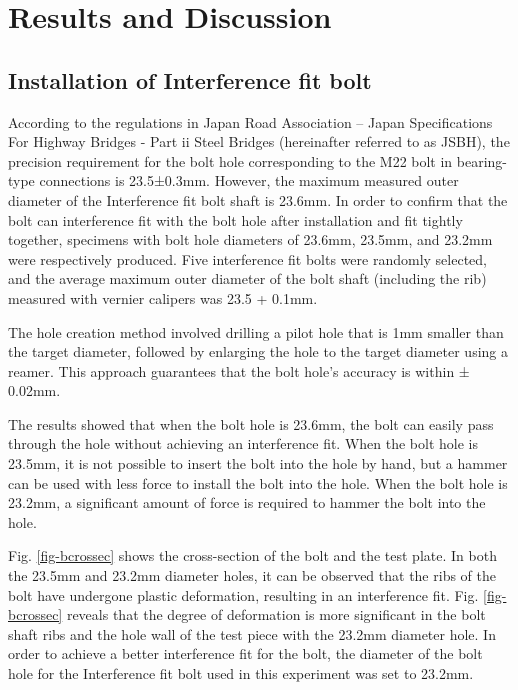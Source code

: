 \section{Results and Discussion}

\subsection{Installation of Interference fit bolt}

According to the regulations in Japan Road Association -- Japan Specifications For Highway Bridges - Part ii Steel Bridges\cite{douji2017} (hereinafter referred to as JSBH), the precision requirement for the bolt hole corresponding to the M22 bolt in bearing-type connections is 23.5±0.3mm. However, the maximum measured outer diameter of the Interference fit bolt shaft is 23.6mm. In order to confirm that the bolt can interference fit with the bolt hole after installation and fit tightly together, specimens with bolt hole diameters of 23.6mm, 23.5mm, and 23.2mm were respectively produced. Five interference fit bolts were randomly selected, and the average maximum  outer diameter of the bolt shaft (including the rib) measured with vernier calipers was 23.5 + 0.1mm.

The hole creation method involved drilling a pilot hole that is 1mm smaller than the target diameter, followed by enlarging the hole to the target diameter using a reamer. This approach guarantees that the bolt hole's accuracy is within ± 0.02mm.

The results showed that when the bolt hole is 23.6mm, the bolt can easily pass through the hole without achieving an interference fit. When the bolt hole is 23.5mm, it is not possible to insert the bolt into the hole by hand, but a hammer can be used with less force to install the bolt into the hole. When the bolt hole is 23.2mm, a significant amount of force is required to hammer the bolt into the hole.

Fig. \ref{fig-bcrossec} shows the cross-section of the bolt and the test plate. In both the 23.5mm and 23.2mm diameter holes, it can be observed that the ribs of the bolt have undergone plastic deformation, resulting in an interference fit. Fig. \ref{fig-bcrossec} reveals that the degree of deformation is more significant in the bolt shaft ribs and the hole wall of the test piece with the 23.2mm diameter hole. In order to achieve a better interference fit for the bolt, the diameter of the bolt hole for the Interference fit bolt used in this experiment was set to 23.2mm.


